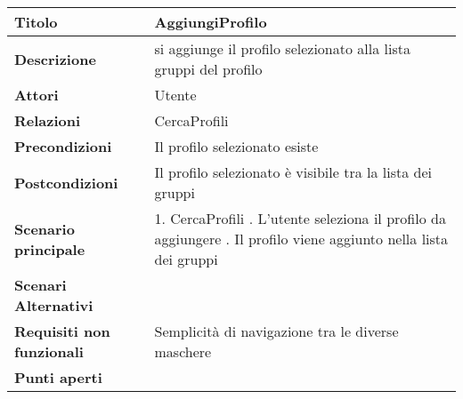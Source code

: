 \begin{tabular} {|P{4.5cm}|P{12.5cm}|}
  \hline
  \textbf{Titolo}                   & AggiungiProfilo                                                  \\
  \hline
  \textbf{Descrizione}              & si aggiunge il profilo selezionato alla lista gruppi del profilo \\
  \hline
  \textbf{Attori}                   & Utente                                                           \\
  \hline
  \textbf{Relazioni}                & CercaProfili                                                     \\
  \hline
  \textbf{Precondizioni}            & Il profilo selezionato esiste                                    \\
  \hline
  \textbf{Postcondizioni}           & Il profilo selezionato è visibile tra la lista dei gruppi        \\
  \hline
  \textbf{Scenario principale}      & 1. CercaProfili . L'utente seleziona il profilo da aggiungere . Il profilo viene aggiunto nella lista dei gruppi\linebreak                                        \\
  \hline
  \textbf{Scenari Alternativi}      &                                                                  \\
  \hline
  \textbf{Requisiti non funzionali} & Semplicità di navigazione tra le diverse maschere                \\
  \hline
  \textbf{Punti aperti}             &                                                                  \\
  \hline
\end{tabular}
\hfill
\break

